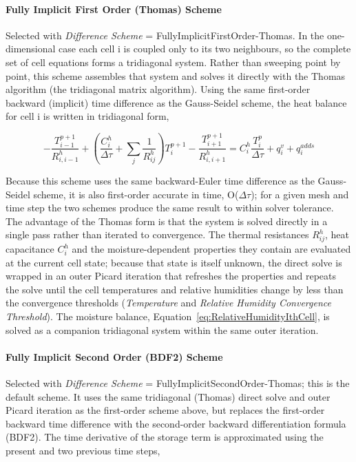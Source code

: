\paragraph{Fully Implicit First Order (Thomas) Scheme}\label{heat-transfer-thomas}

Selected with \emph{Difference Scheme} = FullyImplicitFirstOrder-Thomas. In the one-dimensional case each cell i is coupled only to its two neighbours, so the complete set of cell equations forms a tridiagonal system. Rather than sweeping point by point, this scheme assembles that system and solves it directly with the Thomas algorithm (the tridiagonal matrix algorithm). Using the same first-order backward (implicit) time difference as the Gauss-Seidel scheme, the heat balance for cell i is written in tridiagonal form,

\begin{equation}
- \frac{T_{i-1}^{p+1}}{R_{i,i-1}^h} + \left( {\frac{{C_i^h}}{{\Delta \tau }} + \sum\limits_j {\frac{1}{{R_{ij}^h}}} } \right)T_i^{p+1} - \frac{T_{i+1}^{p+1}}{R_{i,i+1}^h} = C_i^h\frac{{T_i^p}}{{\Delta \tau }} + q_i^v + q_i^{adds}
\label{eq:HeatTransferThomas}
\end{equation}

Because this scheme uses the same backward-Euler time difference as the Gauss-Seidel scheme, it is also first-order accurate in time, O(\(\Delta \tau\)); for a given mesh and time step the two schemes produce the same result to within solver tolerance. The advantage of the Thomas form is that the system is solved directly in a single pass rather than iterated to convergence. The thermal resistances \(R_{ij}^h\), heat capacitance \(C_i^h\) and the moisture-dependent properties they contain are evaluated at the current cell state; because that state is itself unknown, the direct solve is wrapped in an outer Picard iteration that refreshes the properties and repeats the solve until the cell temperatures and relative humidities change by less than the convergence thresholds (\emph{Temperature} and \emph{Relative Humidity Convergence Threshold}). The moisture balance, Equation~\ref{eq:RelativeHumidityIthCell}, is solved as a companion tridiagonal system within the same outer iteration.

\paragraph{Fully Implicit Second Order (BDF2) Scheme}\label{heat-transfer-bdf2}

Selected with \emph{Difference Scheme} = FullyImplicitSecondOrder-Thomas; this is the default scheme. It uses the same tridiagonal (Thomas) direct solve and outer Picard iteration as the first-order scheme above, but replaces the first-order backward time difference with the second-order backward differentiation formula (BDF2). The time derivative of the storage term is approximated using the present and two previous time steps,

